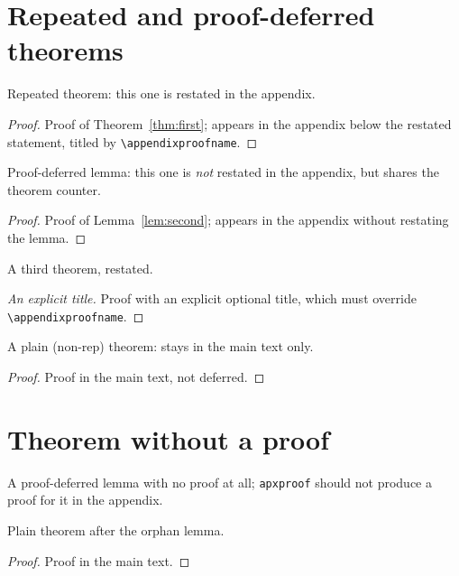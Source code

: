 \documentclass{article}
\date{}
\begin{document}
\section{Repeated and proof-deferred theorems}

\begin{theoremrep}\label{thm:first}
  Repeated theorem: this one is restated in the appendix.
\end{theoremrep}
\begin{proof}
  Proof of Theorem~\ref{thm:first}; appears in the appendix below the
  restated statement, titled by \texttt{\textbackslash appendixproofname}.
\end{proof}

\begin{lemmarep}\label{lem:second}
  Proof-deferred lemma: this one is \emph{not} restated in the appendix,
  but shares the theorem counter.
\end{lemmarep}
\begin{proof}
  Proof of Lemma~\ref{lem:second}; appears in the appendix without
  restating the lemma.
\end{proof}

\begin{theoremrep}\label{thm:third}
  A third theorem, restated.
\end{theoremrep}
\begin{proof}[An explicit title]
  Proof with an explicit optional title, which must override
  \texttt{\textbackslash appendixproofname}.
\end{proof}

\begin{theorem}\label{thm:plain}
  A plain (non-rep) theorem: stays in the main text only.
\end{theorem}
\begin{proof}
  Proof in the main text, not deferred.
\end{proof}

\section{Theorem without a proof}

\begin{lemmarep}\label{lem:noproof}
  A proof-deferred lemma with no proof at all; \texttt{apxproof} should
  not produce a proof for it in the appendix.
\end{lemmarep}
\noproofinappendix

\begin{theorem}
  Plain theorem after the orphan lemma.
\end{theorem}
\begin{proof}
  Proof in the main text.
\end{proof}
\end{document}
